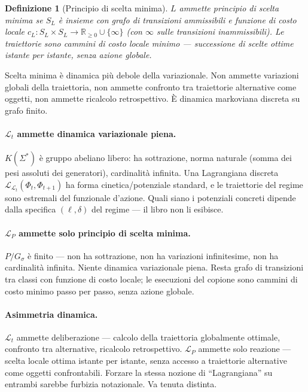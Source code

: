 \documentclass[
    oneside,                 %
    openany,                 %
    titlepage,
    11pt,
    a4paper,
    italian,
    DIV=14,                  %
    headinclude,
    footinclude=true,
    cleardoublepage=empty
]{scrbook}
\theoremstyle{ctplain}
\theoremstyle{ctdef}
\newtheorem{defn}[principio]{Definizione}
\theoremstyle{ctrem}
\newcommand{\Lt}{\mathcal{L}_t}
\newcommand{\LP}{\mathcal{L}_P}
\newcommand{\Phii}{\Phi}
\newcommand{\Gs}{G_{\sigma}}
\newcommand{\KSigma}{K(\Sigma^{*})}
\begin{document}
\begin{defn}[Principio di scelta minima]
$L$ ammette principio di scelta minima se $S_L$ è insieme con grafo di transizioni ammissibili e funzione di costo locale $c_L : S_L \times S_L \to \mathbb{R}_{\geq 0} \cup \{\infty\}$ (con $\infty$ sulle transizioni inammissibili). Le traiettorie sono cammini di costo locale minimo --- successione di scelte ottime istante per istante, senza azione globale.
\end{defn}

Scelta minima è dinamica più debole della variazionale. Non ammette variazioni globali della traiettoria, non ammette confronto tra traiettorie alternative come oggetti, non ammette ricalcolo retrospettivo. È dinamica markoviana discreta su grafo finito.

\paragraph{$\Lt$ ammette dinamica variazionale piena.} $\KSigma$ è gruppo abeliano libero: ha sottrazione, norma naturale (somma dei pesi assoluti dei generatori), cardinalità infinita. Una Lagrangiana discreta $\mathcal{L}_{\Lt}(\Phii_t, \Phii_{t+1})$ ha forma cinetica/potenziale standard, e le traiettorie del regime sono estremali del funzionale d'azione. Quali siano i potenziali concreti dipende dalla specifica $(\ell, \delta)$ del regime --- il libro non li esibisce.

\paragraph{$\LP$ ammette solo principio di scelta minima.} $P/\Gs$ è finito --- non ha sottrazione, non ha variazioni infinitesime, non ha cardinalità infinita. Niente dinamica variazionale piena. Resta grafo di transizioni tra classi con funzione di costo locale; le esecuzioni del copione sono cammini di costo minimo passo per passo, senza azione globale.

\paragraph{Asimmetria dinamica.} $\Lt$ ammette deliberazione --- calcolo della traiettoria globalmente ottimale, confronto tra alternative, ricalcolo retrospettivo. $\LP$ ammette solo reazione --- scelta locale ottima istante per istante, senza accesso a traiettorie alternative come oggetti confrontabili. Forzare la stessa nozione di ``Lagrangiana'' su entrambi sarebbe furbizia notazionale. Va tenuta distinta.
\end{document}
